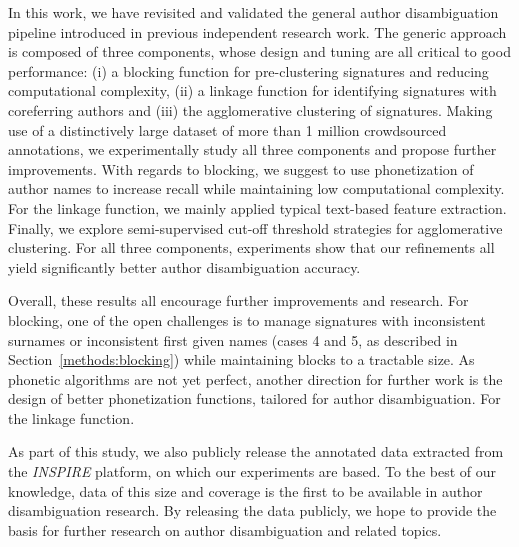 \documentclass[conference]{IEEEtran}
\begin{document}
In this work, we have revisited and validated the general author disambiguation
pipeline introduced in previous independent research work.
The generic approach is composed of three components, whose design and tuning are all critical
to good performance: (i) a blocking function for pre-clustering signatures
and reducing computational complexity, (ii) a linkage function for identifying
signatures with coreferring authors and (iii) the agglomerative clustering of
signatures. Making use of a distinctively large dataset of more than 1 million
crowdsourced annotations, we experimentally study all three components and
propose further improvements. With regards to blocking, we suggest to use
phonetization of author names to increase recall while maintaining low
computational complexity. For the linkage function, we mainly applied typical text-based feature extraction. Finally, we explore semi-supervised cut-off
threshold strategies for agglomerative clustering. For all three components,
experiments show that our refinements all yield significantly better author
disambiguation accuracy.

Overall, these results all encourage further improvements and research. For
blocking, one of the open challenges is to manage signatures with inconsistent
surnames or inconsistent first given names (cases 4 and 5, as described in
Section~\ref{methods:blocking}) while maintaining blocks to a tractable size.
As phonetic algorithms are not yet perfect, another direction  for further work is the design of better
phonetization functions, tailored for author disambiguation. For the linkage function.

As part of this study, we also publicly release the annotated data extracted
from the \emph{INSPIRE} platform, on which our experiments are based.
To the best of our knowledge, data of this size and coverage is the first to be
available in author disambiguation research. By releasing the data publicly,
we hope to provide the basis for further research on author disambiguation
and related topics.








\end{document}
